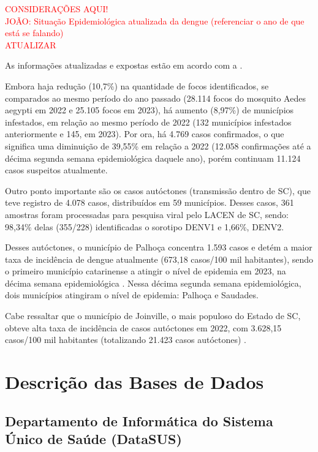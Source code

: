\begin{center}
\textcolor{red}{CONSIDERAÇÕES AQUI!}\\
\indent \textcolor{red}{JOÃO: Situação Epidemiológica atualizada da dengue (referenciar o ano de que está se falando)\\ATUALIZAR\\}
\end{center}

\indent As informações atualizadas e expostas estão em acordo com a .

\indent Embora haja redução (10,7\%) na quantidade de focos identificados, se comparados ao mesmo período do ano passado (28.114 focos do mosquito Aedes aegypti em 2022 e 25.105 focos em 2023), há aumento (8,97\%) de municípios infestados, em relação ao mesmo período de 2022 (132 municípios infestados anteriormente e 145, em 2023). Por ora, há 4.769 casos confirmados, o que significa uma diminuição de 39,55\% em relação a 2022 (12.058 confirmações até a décima segunda semana epidemiológica daquele ano), porém continuam 11.124 casos suspeitos atualmente.

\indent Outro ponto importante são os casos autóctones (transmissão dentro de \acrlong{SC}), que teve registro de 4.078 casos, distribuídos em 59 municípios. Desses casos, 361 amostras foram processadas para pesquisa viral pelo \acrfull{LACEN} de \acrlong{SC}, sendo: 98,34\% delas (355/228) identificadas o sorotipo DENV1 e 1,66\%, DENV2.

\indent Desses autóctones, o município de Palhoça concentra 1.593 casos e detém a maior taxa de incidência de dengue atualmente (673,18 casos/100 mil habitantes), sendo o primeiro município catarinense a atingir o nível de epidemia em 2023, na décima semana epidemiológica \cite{Informe6DiveSE10/23}. Nessa décima segunda semana epidemiológica, dois municípios atingiram o nível de epidemia: Palhoça e Saudades.

\indent Cabe ressaltar que o município de Joinville, o mais populoso do Estado de \acrlong{SC}, obteve alta taxa de incidência de casos autóctones em 2022, com 3.628,15 casos/100 mil habitantes (totalizando 21.423 casos autóctones) \cite{Informe31DiveSE52/22}.

\section{Descrição das Bases de Dados}

\subsection{Departamento de Informática do Sistema Único de Saúde (DataSUS)}

